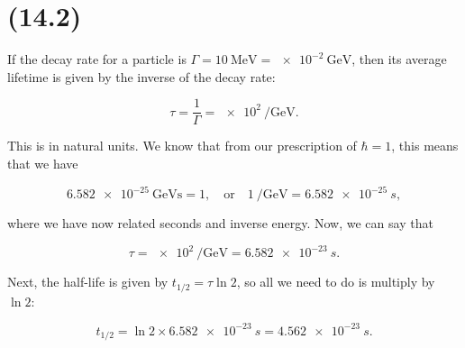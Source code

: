 \section{(14.2)}

If the decay rate for a particle is $\Gamma = \qty{10}{\mega\electronvolt} = \qty{e-2}{\giga\electronvolt}$, then its average lifetime is given by the inverse of the decay rate:

\begin{equation}
    \tau = \frac{1}{\Gamma} = \qty{e2}{\per\giga\electronvolt}.
\end{equation}

This is in natural units. We know that from our prescription of $\hbar = 1$, this means that we have

\begin{equation*}
    \qty{6.582e-25}{\giga\electronvolt\second} = 1, \quad \mathrm{or} \quad \qty{1}{\per\giga\electronvolt} = \qty{6.582e-25}{s},
\end{equation*}

where we have now related seconds and inverse energy. Now, we can say that

\begin{equation*}
    \tau = \qty{e2}{\per\giga\electronvolt} = \boxed{\qty{6.582e-23}{s}.}    
\end{equation*}

Next, the half-life is given by $t_{1/2} = \tau \ln2$, so all we need to do is multiply by $\ln2$:

\begin{equation*}
    t_{1/2} = \ln2 \times \qty{6.582e-23}{s} = \boxed{\qty{4.562e-23}{s}.}
\end{equation*}